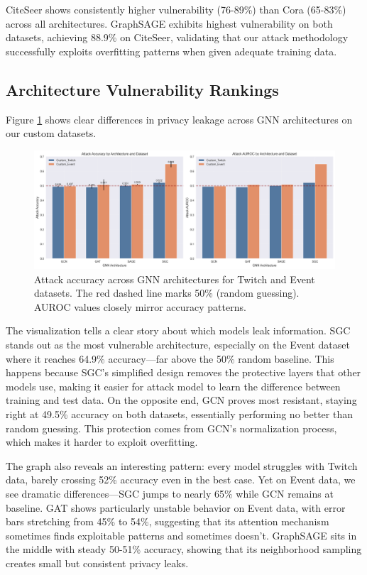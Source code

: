 \documentclass{article}
\begin{document}
CiteSeer shows consistently higher vulnerability (76-89\%) than Cora (65-83\%) across all architectures. GraphSAGE exhibits highest vulnerability on both datasets, achieving 88.9\% on CiteSeer, validating that our attack methodology successfully exploits overfitting patterns when given adequate training data.

\subsection{Architecture Vulnerability Rankings}
Figure \ref{fig:attack-performance} shows clear differences in privacy leakage across GNN architectures on our custom datasets.

\begin{figure}[H]
\centering
\includegraphics[width=\textwidth]{../Results/visualizations/attack_performance_comparison.png}
\caption{Attack accuracy across GNN architectures for Twitch and Event datasets. The red dashed line marks 50\% (random guessing). AUROC values closely mirror accuracy patterns.}
\label{fig:attack-performance}
\end{figure}

The visualization tells a clear story about which models leak information. SGC stands out as the most vulnerable architecture, especially on the Event dataset where it reaches 64.9\% accuracy—far above the 50\% random baseline. This happens because SGC's simplified design removes the protective layers that other models use, making it easier for attack model to learn the difference between training and test data. On the opposite end, GCN proves most resistant, staying right at 49.5\% accuracy on both datasets, essentially performing no better than random guessing. This protection comes from GCN's normalization process, which makes it harder to exploit overfitting.

The graph also reveals an interesting pattern: every model struggles with Twitch data, barely crossing 52\% accuracy even in the best case. Yet on Event data, we see dramatic differences—SGC jumps to nearly 65\% while GCN remains at baseline. GAT shows particularly unstable behavior on Event data, with error bars stretching from 45\% to 54\%, suggesting that its attention mechanism sometimes finds exploitable patterns and sometimes doesn't. GraphSAGE sits in the middle with steady 50-51\% accuracy, showing that its neighborhood sampling creates small but consistent privacy leaks.
\end{document}
